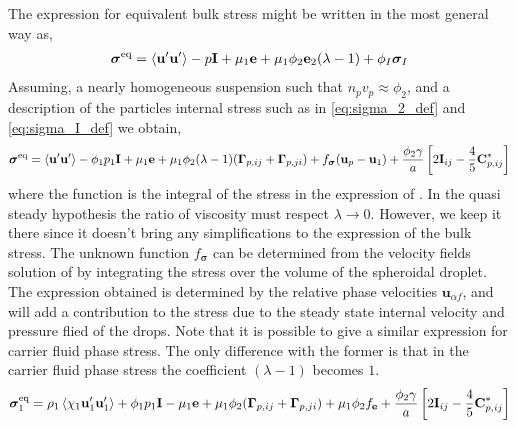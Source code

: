 The expression for equivalent bulk stress might be written in the most general way as, 
\begin{align*}
    \bm{\sigma}^\text{eq}
    = \left<\textbf{u}'\textbf{u}'\right>
    - p \textbf{I}
    + \mu_1 \textbf{e}
    + \mu_1 \phi_2 \textbf{e}_2 (\lambda - 1)
    +\phi_I \bm{\sigma}_I 
\end{align*}
Assuming, a nearly homogeneous suspension such that $n_p v_p \approx \phi_2$, and a description of the particles internal stress such as in \ref{eq:sigma_2_def} and \ref{eq:sigma_I_def} we obtain, 
\begin{align*}
    \bm{\sigma}^\text{eq}
    = \left<\textbf{u}'\textbf{u}'\right> 
    - \phi_1 p_1 \textbf{I}
    + \mu_1 \textbf{e}
    + \mu_1 \phi_2  (\lambda - 1) (\bm\Gamma_{p,ij} + \bm\Gamma_{p,ji})
    + f_{\bm \sigma}(\textbf{u}_p - \textbf{u}_1)
    + \frac{\phi_2 \gamma}{a} \left[
        2 \textbf{I}_{ij} - \frac{4}{5} \textbf{C}_{p,ij}^*
    \right]
\end{align*}
where the function is the integral of the stress in the expression of \citet{taylor1964deformation}. 
In the quasi steady hypothesis the ratio of viscosity must respect $\lambda \to 0$. 
However, we keep it there since it doesn't bring any simplifications to the expression of the bulk stress. 
The unknown function $f_{\bm\sigma}$ can be determined from the velocity fields solution of \citet{taylor1964deformation} by integrating the stress over the volume of the spheroidal droplet. 
The expression obtained is determined by the relative phase velocities $\textbf{u}_{\alpha f}$, and will add a contribution to the stress due to the steady state internal velocity and pressure flied of the drops. 
Note that it is possible to give a similar expression for carrier fluid phase stress. 
The only difference with the former is that in the carrier fluid phase stress the coefficient $(\lambda - 1)$ becomes $1$. 
\begin{multline*}
    \bm{\sigma}^\text{eq}_1 = 
    \rho_1\left<\chi_1\textbf{u}_1'\textbf{u}_1'\right> 
    + \phi_1 p_1 \textbf{I} 
    - \mu_1 \textbf{e} 
    + \mu_1 \phi_2 (\bm\Gamma_{p,ij} + \bm\Gamma_{p,ji})
    + \mu_1 \phi_2 f_{\textbf{e}}
    + \frac{\phi_2 \gamma}{a} \left[
        2 \textbf{I}_{ij} - \frac{4}{5} \textbf{C}_{p,ij}^*
    \right]
    \label{eq:Steady_state_bubble}
\end{multline*} 

